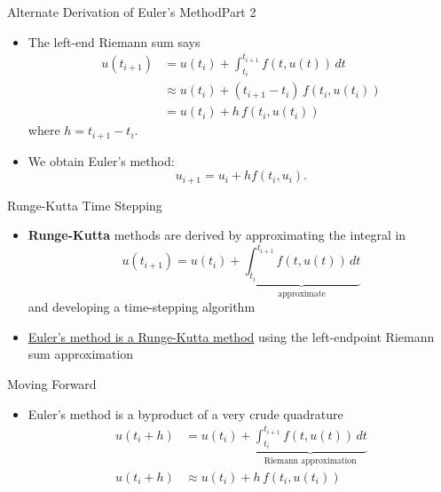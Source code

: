 \documentclass[10pt]{beamer}
\begin{document}
\begin{frame}{Alternate Derivation of Euler's Method}{Part 2}
\begin{itemize}
    \item The left-end Riemann sum says
        \begin{align*}
            u(t_{i+1}) &= u(t_i)+ \int_{t_i}^{t_{i+1}} f(t, u(t)) \, dt\\
                      &\approx u(t_i) + (t_{i+1}-t_i)\, f(t_i, u(t_i))\\ 
                      &= u(t_i) + h\,f(t_i, u(t_i)) 
        \end{align*}
        where \(h = t_{i+1} - t_i\).

    \item We obtain Euler’s method:
    \[
    u_{i+1} = u_i + h f(t_i, u_i).
    \]
\end{itemize}
\end{frame}


\begin{frame}{Runge-Kutta Time Stepping}
    \begin{itemize}
        \item \textbf{Runge-Kutta} methods are derived by approximating the integral in 
            $$
            u(t_{i+1}) = u(t_i) + \underbrace{\int_{t_i}^{t_{i+1}} f(t, u(t)) \, dt}_{\text{approximate}}
            $$
        and developing a time-stepping algorithm\\[3mm]

        \item \underline{Euler's method is a Runge-Kutta method} using the left-endpoint Riemann sum approximation
    \end{itemize}
\end{frame}



\begin{frame}{Moving Forward}

\begin{itemize}
    \item Euler's method is a byproduct of a very crude quadrature 
        \begin{align*}
        u(t_i+h) &= u(t_i) + \underbrace{\int_{t_i}^{t_{i+1}} f(t,u(t))\,dt}_{\text{Riemann approximation}}\\        
        u(t_i+h) &\approx u(t_i) + h\,f(t_i,u(t_i))\\            
    \end{align*}
\end{itemize}

\end{frame}
\end{document}
